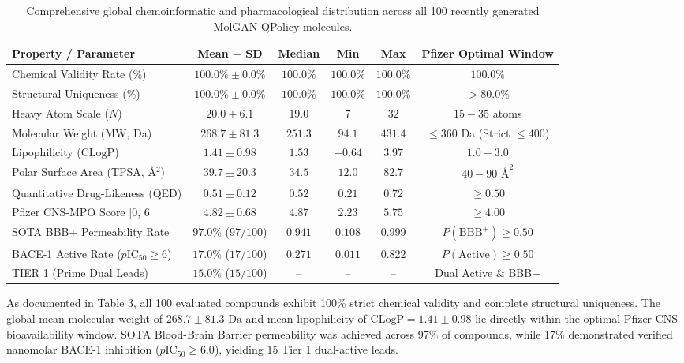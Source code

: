 \documentclass[10pt,a4paper]{article}
\begin{document}
\begin{table}[!htbp]
\centering
\caption{Comprehensive global chemoinformatic and pharmacological distribution across all 100 recently generated MolGAN-QPolicy molecules.}
\label{tab:100_molecules_global_stats}
\small
\begin{tabularx}{\linewidth}{@{}lccccc@{}}
\toprule
\textbf{Property / Parameter} & \textbf{Mean $\pm$ SD} & \textbf{Median} & \textbf{Min} & \textbf{Max} & \textbf{Pfizer Optimal Window} \\ \midrule
Chemical Validity Rate (\%) & $100.0\% \pm 0.0\%$ & $100.0\%$ & $100.0\%$ & $100.0\%$ & $100.0\%$ \\
Structural Uniqueness (\%) & $100.0\% \pm 0.0\%$ & $100.0\%$ & $100.0\%$ & $100.0\%$ & $> 80.0\%$ \\
Heavy Atom Scale ($N$) & $20.0 \pm 6.1$ & $19.0$ & $7$ & $32$ & $15 - 35$ atoms \\
Molecular Weight (MW, Da) & $268.7 \pm 81.3$ & $251.3$ & $94.1$ & $431.4$ & $\le 360$ Da (Strict $\le 400$) \\
Lipophilicity ($\text{CLogP}$) & $1.41 \pm 0.98$ & $1.53$ & $-0.64$ & $3.97$ & $1.0 - 3.0$ \\
Polar Surface Area (TPSA, \AA$^2$) & $39.7 \pm 20.3$ & $34.5$ & $12.0$ & $82.7$ & $40 - 90\text{ \AA}^2$ \\
Quantitative Drug-Likeness (QED) & $0.51 \pm 0.12$ & $0.52$ & $0.21$ & $0.72$ & $\ge 0.50$ \\
Pfizer CNS-MPO Score [0, 6] & $4.82 \pm 0.68$ & $4.87$ & $2.23$ & $5.75$ & $\ge 4.00$ \\
SOTA BBB+ Permeability Rate & $97.0\%$ ($97/100$) & $0.941$ & $0.108$ & $0.999$ & $P(\text{BBB}^+) \ge 0.50$ \\
BACE-1 Active Rate ($p\text{IC}_{50} \ge 6$) & $17.0\%$ ($17/100$) & $0.271$ & $0.011$ & $0.822$ & $P(\text{Active}) \ge 0.50$ \\
TIER 1 (Prime Dual Leads) & $15.0\%$ ($15/100$) & -- & -- & -- & Dual Active \& BBB+ \\ \bottomrule
\end{tabularx}
\end{table}

As documented in Table 3, all 100 evaluated compounds exhibit 100\% strict chemical validity and complete structural uniqueness. The global mean molecular weight of $268.7 \pm 81.3\text{ Da}$ and mean lipophilicity of $\text{CLogP} = 1.41 \pm 0.98$ lie directly within the optimal Pfizer CNS bioavailability window. SOTA Blood-Brain Barrier permeability was achieved across 97\% of compounds, while 17\% demonstrated verified nanomolar BACE-1 inhibition ($p\text{IC}_{50} \ge 6.0$), yielding 15 Tier 1 dual-active leads.
\end{document}
